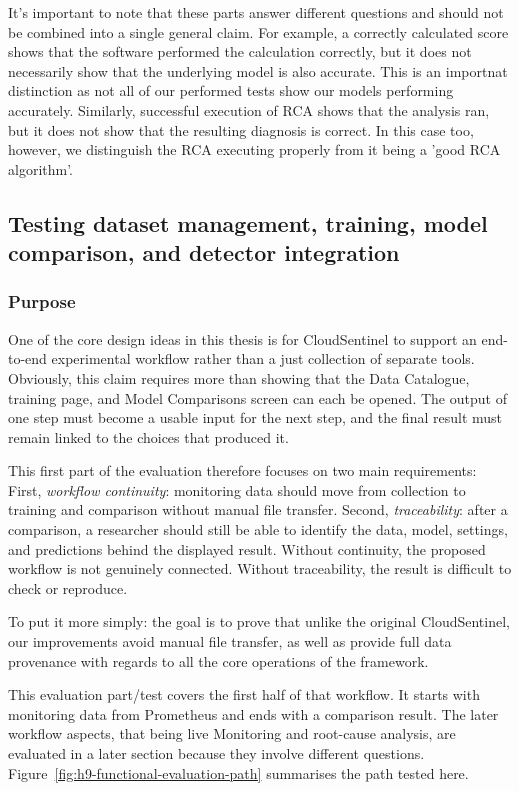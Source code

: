 It's important to note that these parts answer different questions and should not be combined into a single general claim. For example, a correctly calculated score shows that the software performed the calculation correctly, but it does not necessarily show that the underlying model is also accurate. This is an importnat distinction as not all of our performed tests show our models performing accurately. Similarly, successful execution of RCA shows that the analysis ran, but it does not show that the resulting diagnosis is correct. In this case too, however, we distinguish the RCA executing properly from it being a 'good RCA algorithm'.

\subsection{Testing dataset management, training, model comparison, and detector integration}
\label{sec:h9-workflow-functional-evaluation}

\subsubsection{Purpose}
One of the core design ideas in this thesis is for CloudSentinel to support an end-to-end experimental workflow rather than a just collection of separate tools. Obviously, this claim requires more than showing that the Data Catalogue, training page, and Model Comparisons screen can each be opened. The output of one step must become a usable input for the next step, and the final result must remain linked to the choices that produced it.

This first part of the evaluation therefore focuses on two main requirements:\\
First, \emph{workflow continuity}: monitoring data should move from collection to training and comparison without manual file transfer. Second, \emph{traceability}: after a comparison, a researcher should still be able to identify the data, model, settings, and predictions behind the displayed result. Without continuity, the proposed workflow is not genuinely connected. Without traceability, the result is difficult to check or reproduce.

To put it more simply: the goal is to prove that unlike the original CloudSentinel, our improvements avoid manual file transfer, as well as provide full data provenance with regards to all the core operations of the framework.

This evaluation part/test covers the first half of that workflow. It starts with monitoring data from Prometheus and ends with a comparison result. The later workflow aspects, that being live Monitoring and root-cause analysis, are evaluated in a later section because they involve different questions. Figure~\ref{fig:h9-functional-evaluation-path} summarises the path tested here.

